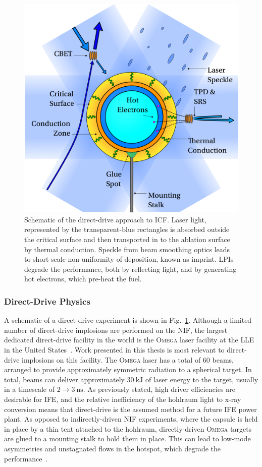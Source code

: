 \begin{figure}[t!]
    \includegraphics[width=0.7\linewidth]{Introduction/Images/direct icf white.png}
    \centering
    \caption{Schematic of the direct-drive approach to \ac{ICF}.
    Laser light, represented by the transparent-blue rectangles is absorbed outside the critical surface and then transported in to the ablation surface by thermal conduction.
    Speckle from beam smoothing optics leads to short-scale non-uniformity of deposition, known as imprint.
    \ac{LPIs} degrade the performance, both by reflecting light, and by generating hot electrons, which pre-heat the fuel.
    }%
    \label{fig:intro_direct}
\end{figure}

\subsubsection{Direct-Drive Physics}%
\label{sec:intro_direct_phys}

A schematic of a direct-drive experiment is shown in Fig.~\ref{fig:intro_direct}.
Although a limited number of direct-drive implosions are performed on the \ac{NIF}, the largest dedicated direct-drive facility in the world is the \textsc{Omega} laser facility at the \ac{LLE} in the United States~\cite{simon_lle_1989,boehly_upgrade_1995}.
Work presented in this thesis is most relevant to direct-drive implosions on this facility.
The \textsc{Omega} laser has a total of 60 beams, arranged to provide approximately symmetric radiation to a spherical target.
In total, beams can deliver approximately $30\ \text{kJ}$ of laser energy to the target, usually in a timescale of $2\rightarrow3\ \text{ns}$.
As previously stated, high driver efficiencies are desirable for \ac{IFE}, and the relative inefficiency of the hohlraum light to x-ray conversion means that direct-drive is the assumed method for a future \ac{IFE} power plant.
As opposed to indirectly-driven \ac{NIF} experiments, where the capsule is held in place by a thin tent attached to the hohlraum, directly-driven \textsc{Omega} targets are glued to a mounting stalk to hold them in place.
This can lead to low-mode asymmetries and unstagnated flows in the hotspot, which degrade the performance~\cite{gatujohnson_impact_2020}.

